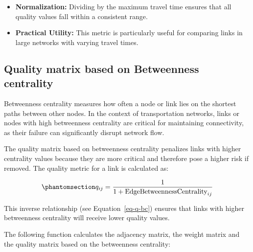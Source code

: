 \documentclass[
  letterpaper,
  DIV=11,
  numbers=noendperiod]{scrartcl}
\providecommand{\tightlist}{%
  \setlength{\itemsep}{0pt}\setlength{\parskip}{0pt}}\usepackage{longtable,booktabs,array}
\begin{document}
\begin{itemize}
\tightlist
\item
  \textbf{Normalization:} Dividing by the maximum travel time ensures
  that all quality values fall within a consistent range.
\item
  \textbf{Practical Utility:} This metric is particularly useful for
  comparing links in large networks with varying travel times.
\end{itemize}

\subsection{Quality matrix based on Betweenness
centrality}\label{quality-matrix-based-on-betweenness-centrality}

Betweenness centrality measures how often a node or link lies on the
shortest paths between other nodes. In the context of transportation
networks, links or nodes with high betweenness centrality are critical
for maintaining connectivity, as their failure can significantly disrupt
network flow.

The quality matrix based on betweenness centrality penalizes links with
higher centrality values because they are more critical and therefore
pose a higher risk if removed. The quality metric for a link is
calculated as:

\begin{equation}\phantomsection\label{eq-q-bc}{
q_{ij} = \frac{1}{1 + \text{EdgeBetweennessCentrality}_{ij}}
}\end{equation}

This inverse relationship (see Equation~\ref{eq-q-bc}) ensures that
links with higher betweenness centrality will receive lower quality
values.

The following function calculates the adjacency matrix, the weight
matrix and the quality matrix based on the betweenness centrality:
\end{document}
